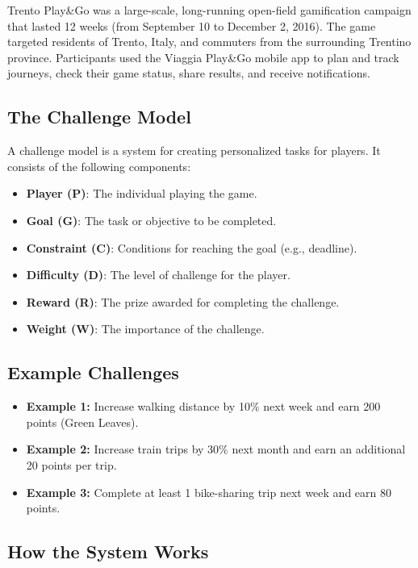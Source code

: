 Trento Play\&Go was a large-scale, long-running open-field gamification campaign that lasted 12 weeks (from September 10 to December 2, 2016). The game targeted residents of Trento, Italy, and commuters from the surrounding Trentino province. Participants used the Viaggia Play\&Go mobile app to plan and track journeys, check their game status, share results, and receive notifications.

\subsection{The Challenge Model}

A challenge model is a system for creating personalized tasks for players. It consists of the following components:

\begin{itemize}
    \item \textbf{Player (P)}: The individual playing the game.
    \item \textbf{Goal (G)}: The task or objective to be completed.
    \item \textbf{Constraint (C)}: Conditions for reaching the goal (e.g., deadline).
    \item \textbf{Difficulty (D)}: The level of challenge for the player.
    \item \textbf{Reward (R)}: The prize awarded for completing the challenge.
    \item \textbf{Weight (W)}: The importance of the challenge.
\end{itemize}

\subsection{Example Challenges}

\begin{itemize}
    \item \textbf{Example 1:} Increase walking distance by 10\% next week and earn 200 points (Green Leaves).
    \item \textbf{Example 2:} Increase train trips by 30\% next month and earn an additional 20 points per trip.
    \item \textbf{Example 3:} Complete at least 1 bike-sharing trip next week and earn 80 points.
\end{itemize}

\subsection{How the System Works}


